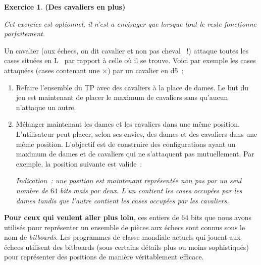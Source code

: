 \documentclass[11pt]{article}
\theoremstyle{definition}
\newtheorem{Exercice}{Exercice}
\begin{document}
\begin{Exercice}{\bf (Des cavaliers en plus)}\smallskip

{\em Cet exercice est optionnel, il n'est a envisager que lorsque
tout le reste fonctionne parfaitement.}
\smallskip

Un cavalier (aux échecs, on dit \og cavalier \fg{} et non pas
\og cheval \fg{}~!) attaque toutes les cases situées \og en L \fg\,
par rapport à celle où il se trouve. Voici par exemple les cases
attaquées (cases contenant une $\times$) par un cavalier en d5~:
\begin{center}\showboard\end{center}

\begin{enumerate}
    \item Refaire l'ensemble du TP avec des cavaliers à la place
    de dames. Le but du jeu est maintenant de placer le maximum de
    cavaliers sans qu'aucun n'attaque un autre.
    \smallskip

    \item Mélanger maintenant les dames et les cavaliers dans une même
    position. L'utilisateur peut placer, selon ses envies, des dames
    et des cavaliers dans une même position. L'objectif est de
    construire des configurations ayant un maximum de dames et de
    cavaliers qui ne s'attaquent pas mutuellement. Par exemple, la
    position suivante est valide~:
    \begin{center}\showboard\end{center}
    \smallskip

    {\it Indication~: une position est maintenant représentée non
    pas par un seul nombre de $64$ bits mais par deux. L'un contient
    les cases occupées par les dames tandis que l'autre contient
    les cases occupées par les cavaliers.}
\end{enumerate}
\end{Exercice}
\bigskip

{\bf Pour ceux qui veulent aller plus loin}, ces entiers de $64$ bits
que nous avons utilisés pour représenter un ensemble de pièces aux échecs
sont connus sous le nom de {\em bitboards}. Les programmes de classe
mondiale actuels qui jouent aux échecs utilisent des bitboards (sous
certains détails plus ou moins sophistiqués) pour représenter des
positions de manière véritablement efficace.
\end{document}
